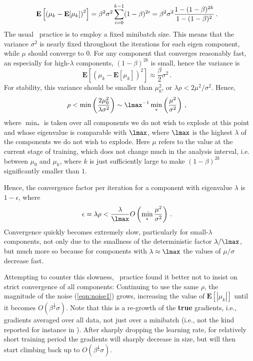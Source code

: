 \documentclass{article} %
\begin{document}
\begin{equation}
\mathbf E \left [\left(\mu_k - \mathbf E [\mu_k] \right)^2 \right ] =
\beta^2\sigma^2 \sum_{i=0}^{k-1} (1-\beta)^{2i} \\ =
\beta^2\sigma^2\frac{1-(1-\beta)^{2k}}{1-(1-\beta)^2}\,.
\label{eqn:noise1}
\end{equation}
The usual \SGD~practice is to employ a fixed minibatch size. This means that the variance $\sigma^2$ is nearly fixed throughout the iterations for each eigen component, while $\mu$ should converge to $0$. For any component that converges reasonably fast, an especially for high-$\lambda$ components, $(1 - \beta)^{2k}$ is small, hence the variance is
\begin{equation}
\mathbf E \left [\left(\mu_k - \mathbf E [\mu_k] \right)^2 \right ] \approx \frac{\beta}{2} \sigma^2\,.
\end{equation}
For stability, this variance should be smaller than $\mu_0^2$, or $\lambda \rho < 2 \mu^2/\sigma^2$. Hence,
$$
	\rho < \min \left( \frac{2 \mu_0^2}{\lambda \sigma^2} \right) \sim
	\lmax^{-1} \min_* \left( \frac{\mu^2}{\sigma^2} \right)\,,
$$
where $\min_*$ is taken over all components we do not wish to explode at this point and whose eigenvalue is comparable with $\lmax$, where $\lmax$ is the highest $\lambda$ of the components we do not wish to explode. Here $\mu$ refers to the value at the current stage of training, which does not change much in the analysis interval, i.e. between $\mu_0$ and $\mu_k$, where $k$ is just sufficiently large to make $(1 - \beta)^{2k}$ significantly smaller than $1$.

Hence, the convergence factor per iteration for a component with eigenvalue $\lambda$ is $1 - \epsilon$, where
\begin{equation}
  \epsilon = \lambda \rho < \frac{\lambda}{\lmax} O\left( \min_* \frac{\mu^2}{\sigma^2} \right)\,.
  \label{eqn:convrate1}
\end{equation}
Convergence quickly becomes extremely slow, particularly for small-$\lambda$ components, not only due to the smallness of the deterministic factor $\lambda/\lmax$, but much more so because for components with $\lambda \approx \lmax$ the values of $\mu / \sigma$ decrease fast.

Attempting to counter this slowness, \SGD~practice found it better not to insist on strict convergence of all components: Continuing to use the same $\rho$, the magnitude of the noise (\ref{eqn:noise1}) grows, increasing the value of $\mathbf E[|\mu_k|]$ until it becomes $O(\beta^{\frac12}\sigma)$. Note that this is a re-growth of the \textbf{true} gradients, i.e., gradients averaged over all data, not just over a minibatch (i.e., not the kind reported for instance in \cite[Fig.~8.1]{Goodfellow-et-al-2016}). After sharply dropping the learning rate, for relatively short training period the gradients will sharply decrease in size, but will then start climbing back up to $O(\beta^{\frac12} \sigma)$.
\end{document}

